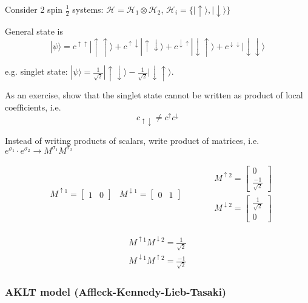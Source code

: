 \documentclass[10pt]{amsart}
\begin{document}
\begin{multicols*}{2}
Consider 2 spin $\frac{1}{2}$ systems: $\mathcal{H} = \mathcal{H}_1 \otimes \mathcal{H}_2$, $\mathcal{H}_i = \lbrace | \uparrow \rangle, | \downarrow \rangle \rbrace$

General state is 
\[
| \psi \rangle = c^{ \uparrow \uparrow} | \uparrow \uparrow \rangle + c^{ \uparrow \downarrow} | \uparrow \downarrow \rangle + c^{ \downarrow \uparrow} | \downarrow \uparrow \rangle + c^{ \downarrow \downarrow} | \downarrow \downarrow \rangle 
\]

e.g. singlet state: $|\psi \rangle = \frac{1}{ \sqrt{2} } | \uparrow \downarrow \rangle - \frac{1}{ \sqrt{2} } | \downarrow \uparrow \rangle $. 

As an exercise, show that the singlet state cannot be written as product of local coefficients, i.e. 
\[
c_{\uparrow \downarrow } \neq c^{\uparrow} c^{ \downarrow }
\]

Instead of writing products of scalars, write product of matrices, i.e. $e^{\sigma_1} \cdot e^{\sigma_2} \to M^{\sigma_1} M^{\sigma_2}$

\[
\begin{gathered}
\begin{aligned}
	& M^{\uparrow 1} = \left[ \begin{matrix} 1 & 0 \end{matrix} \right]
	& M^{\downarrow 1} = \left[ \begin{matrix} 0 & 1 \end{matrix} \right] 
	\end{aligned} \quad \quad \, \begin{aligned}
	& M^{\uparrow 2 } = \left[ \begin{matrix} 0 \\ \frac{-1}{\sqrt{2}} \end{matrix} \right] \\
	& M^{\downarrow 2} = \left[ \begin{matrix} \frac{1}{\sqrt{2}} \\ 0 \end{matrix} \right] 
	\end{aligned}
\end{gathered}
\]

\[
\begin{gathered}
M^{\uparrow 1} M^{\downarrow 2} = \frac{1}{\sqrt{2}} \\ 
M^{\downarrow 1} M^{\uparrow 2} = \frac{-1}{\sqrt{2}} 
\end{gathered}
\]

\subsubsection{AKLT model (Affleck-Kennedy-Lieb-Tasaki)}


\end{multicols*}
\end{document}
